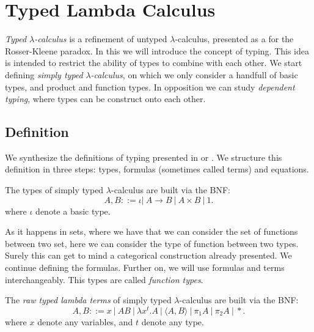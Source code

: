 \section{Typed Lambda Calculus}
\emph{Typed $\lambda$-calculus} is a refinement of untyped $\lambda$-calculus, presented as a for the Rosser-Kleene paradox. In this we will introduce the concept of typing. This idea is intended to restrict the ability of types to combine with each other. We start defining \emph{simply typed }$\lambda$\emph{-calculus}, on which we only consider a handfull of basic types, and product and function types. In opposition we can study \emph{dependent typing}, where types can be construct onto each other.

\subsection{Definition}

 We synthesize the definitions of typing presented in \cite{lambek1988introduction} or \cite{selinger2008lecture}. We structure this definition in three steps: types, formulas (sometimes called terms) and equations.


\begin{definition}
  The types of simply typed $\lambda$-calculus are built via the BNF:
  $$A,B ::= \iota |\ A\to B\ |\ A \times B  \ |\ 1.$$
  where $\iota$ denote a basic type. 
\end{definition}





As it happens in sets, where we have that we can consider the set of functions between two set, here we can consider the type of function between two types. Surely this can get to mind a categorical construction already presented. We continue defining the formulas. Further on, we will use formulas and terms interchangeably. This types are called \emph{function types}.\\




\begin{definition}
  The \emph{raw typed lambda terms} of simply typed $\lambda$-calculus are built via the BNF:
  $$A,B ::= x\ |\ AB\ |\ \lambda x^t.A \ |\ \langle A,B \rangle\ |\ \pi_1A\ |\ \pi_2A\ |\ *.$$
  where $x$ denote any variables, and $t$ denote any type. 
\end{definition}

